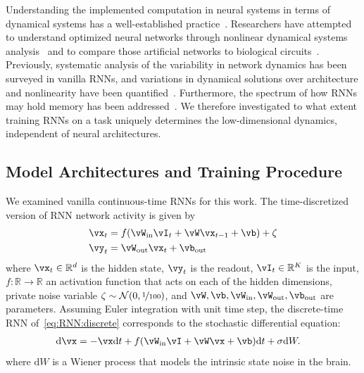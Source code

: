 \documentclass{article} %
\newcounter{ct}
\newcommand{\dm}[1]{\ensuremath{\mathrm{d}{#1}}} %
\newcommand{\win}{\vW_{\text{in}}}
\newcommand{\wout}{\vW_{\text{out}}}
\newcommand{\bout}{\vb_{\text{out}}}
\newcommand{\reals}{\mathbb{R}}
\theoremstyle{definition}
\theoremstyle{remark}
\begin{document}
Understanding the implemented computation in neural systems in terms of dynamical systems has a well-established practice~\citep{seung1996,sompolinsky1988}.
Researchers have attempted to understand optimized neural networks through nonlinear dynamical systems analysis~\citep{sussillo2013blackbox,sussillo2014,barak2013,driscoll2022,maheswaranathan2019universality,cueva2019headdirection,cueva2021continuous} and to compare those artificial networks to biological circuits~\citep{mante2013context,remington2018flexible,ghazizadeh2021slow}.
%
Previously, systematic analysis of the variability in network dynamics has been surveyed in vanilla RNNs, and variations in dynamical solutions over architecture and nonlinearity have been quantified~\citep{sussillo2013blackbox,mante2013context,yang2019task,maheswaranathan2019universality,driscoll2022}.
Furthermore, the spectrum of how RNNs may hold memory has been addressed~\citep{orhan2019diverse}.
We therefore investigated to what extent training RNNs on a task uniquely determines the low-dimensional dynamics, independent of neural architectures.

\subsection{Model Architectures and Training Procedure}
We examined vanilla continuous-time RNNs for this work.
The time-discretized version of RNN network activity is given by
\begin{equation}
  \begin{aligned}
	\vx_t &= f(\win \vI_t + \vW \vx_{t-1} + \vb) + \zeta \label{eq:RNN:discrete}\\
	\vy_t &= \wout \vx_t + \bout
  \end{aligned}
\end{equation}
where \(\vx_t \in \reals^d\) is the hidden state,
\(\vy_t \) is the readout,
\(\vI_t \in \reals^K\) is the input,
\(f\colon \reals \to \reals\) an activation function that acts on each of the hidden dimensions,
private noise variable \(\zeta\sim\mathcal{N}(0,\nicefrac{1}{100})\), and %
\(\vW, \vb, \win, \wout, \bout\) are parameters.
Assuming Euler integration with unit time step, the discrete-time RNN of~\eqref{eq:RNN:discrete} corresponds to the stochastic differential equation:
\begin{align}
    \dm{\vx} &= -\vx\dm{t} + f(\win \vI + \vW \vx + \vb)\dm{t} + \sigma \dm{W}. \label{eq:RNN:continuous}
\end{align}
where \(\dm{W}\) is a Wiener process that models the intrinsic state noise in the brain.
\end{document}
